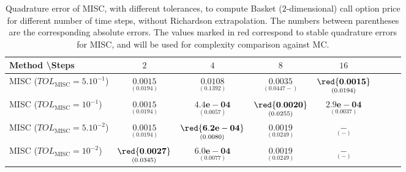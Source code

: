 \FloatBarrier
\begin{table}[h!]
\centering
\begin{tabular}{l*{6}{c}r}
Method \textbackslash  Steps            & $2$ & $4$ & $8$ & $16$  \\
\hline
MISC ($TOL_{\text{MISC}}=5.10^{-1}$)  & $\underset{(  0.0194)}{\mathbf{    0.0015}}$  & $\underset{(   0.1392
	)}{\mathbf{    0.0108}}$ & $\underset{( 0.0447
	
	-
	)}{\mathbf{ 0.0035}}$ &$\underset{(
	0.0194)}{\mathbf{   \red{ 0.0015}}}$ \\
MISC ($TOL_{\text{MISC}}=10^{-1}$)  & $\underset{(  0.0194)}{\mathbf{    0.0015}}$   & $\underset{(   0.0057)}{\mathbf{4.4e-04}}$ & $\underset{(0.0255)}{\mathbf{\red{0.0020}}}$ &$\underset{(0.0037)}{\mathbf{2.9e-04}}$ \\
MISC ($TOL_{\text{MISC}}=5.10^{-2}$)  & $\underset{(  0.0194)}{\mathbf{    0.0015}}$  & $\underset{( 0.0080)}{\mathbf{\red{6.2e-04}}}$ & $\underset{(
	0.0249
	)}{\mathbf{0.0019}}$ &$\underset{(-)}{\mathbf{-}}$ \\
MISC ($TOL_{\text{MISC}}=10^{-2}$)  & $\underset{( 0.0345)}{\mathbf{\red{0.0027}}}$  & $\underset{( 0.0077)}{\mathbf{6.0e-04}}$ & $\underset{(
	0.0249
	)}{\mathbf{0.0019}}$&$\underset{(-)}{\mathbf{-}}$ \\
\hline
\end{tabular}
\caption{Quadrature error of MISC, with different tolerances, to compute Basket ($2$-dimensional) call option price  for different number of time steps, without Richardson extrapolation. The numbers between parentheses are the corresponding absolute errors. The values marked in red correspond to stable quadrature errors for MISC, and will be used for complexity comparison against MC.}
\label{Quadrature error of MISC to compute Basket 2d Call option price of the different tolerances for different number of time steps, without Richardson extrapolation. The numbers between parentheses are the corresponding absolute errors, beta_16}
\end{table}

